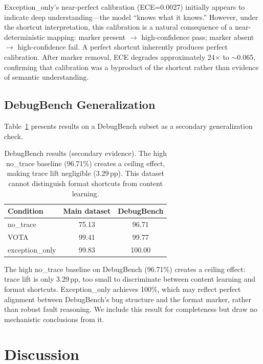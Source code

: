 \documentclass[11pt,a4paper]{article}
\newcommand{\pp}{\,\text{pp}}
\begin{document}
Exception\_only's near-perfect calibration (ECE=0.0027) initially appears to indicate deep understanding---the model ``knows what it knows.''
However, under the shortcut interpretation, this calibration is a natural consequence of a near-deterministic mapping: marker present $\to$ high-confidence pass; marker absent $\to$ high-confidence fail.
A perfect shortcut inherently produces perfect calibration.
After marker removal, ECE degrades approximately 24$\times$ to ${\sim}$0.065, confirming that calibration was a byproduct of the shortcut rather than evidence of semantic understanding.

\subsection{DebugBench Generalization}
\label{sec:debugbench}

Table~\ref{tab:debugbench} presents results on a DebugBench subset as a secondary generalization check.

\begin{table}[t]
\centering
\small
\begin{tabular}{lcc}
\toprule
\textbf{Condition} & \textbf{Main dataset} & \textbf{DebugBench} \\
\midrule
no\_trace & 75.13 & 96.71 \\
VOTA & 99.41 & 99.77 \\
exception\_only & 99.83 & 100.00 \\
\bottomrule
\end{tabular}
\caption{DebugBench results (secondary evidence). The high no\_trace baseline (96.71\%) creates a ceiling effect, making trace lift negligible (3.29$\pp$). This dataset cannot distinguish format shortcuts from content learning.}
\label{tab:debugbench}
\end{table}

The high no\_trace baseline on DebugBench (96.71\%) creates a ceiling effect: trace lift is only 3.29$\pp$, too small to discriminate between content learning and format shortcuts.
Exception\_only achieves 100\%, which may reflect perfect alignment between DebugBench's bug structure and the format marker, rather than robust fault reasoning.
We include this result for completeness but draw no mechanistic conclusions from it.

\section{Discussion}
\label{sec:discussion}
\end{document}
